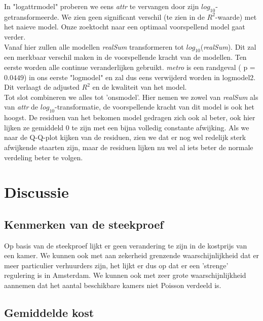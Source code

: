 \documentclass[a4paper]{kulakarticle}
\begin{document}
	In "logattrmodel" proberen we eens \textit{attr} te vervangen door zijn $log_{10}$-getransformeerde. We zien geen significant verschil (te zien in de $R^2$-waarde) met het naieve model. Onze zoektocht naar een optimaal voorspellend model gaat verder. \\
	Vanaf hier zullen alle modellen \textit{realSum} transformeren tot $log_{10}$(\textit{realSum}). Dit zal een merkbaar verschil maken in de voorspellende kracht van de modellen. Ten eerste worden alle continue veranderlijken gebruikt. \textit{metro} is een randgeval ( p = $0.0449$) in ons eerste "logmodel" en zal dus eens verwijderd worden in logmodel2. Dit verlaagt de adjusted $R^2$ en de kwaliteit van het model. \\
	
	Tot slot combineren we alles tot 'onsmodel'. Hier nemen we zowel van \textit{realSum} als van \textit{attr} de $log_{10}$-transformatie, de voorspellende kracht van dit model is ook het hoogst. De residuen van het bekomen model gedragen zich ook al beter, ook hier lijken ze gemiddeld 0 te zijn met een bijna volledig constante afwijking. Als we naar de Q-Q-plot kijken van de residuen, zien we dat er nog wel redelijk sterk afwijkende staarten zijn, maar de residuen lijken nu wel al iets beter de normale verdeling beter te volgen.  
	
	\section{Discussie}
	
	\subsection{Kenmerken van de steekproef}
	Op basis van de steekproef lijkt er geen verandering te zijn in de kostprijs van een kamer. We kunnen ook met aan zekerheid grenzende waarschijnlijkheid dat er meer particulier verhuurders zijn, het lijkt er dus op dat er een 'strenge' regulering is in Amsterdam. We kunnen ook met zeer grote waarschijnlijkheid aannemen dat het aantal beschikbare kamers niet Poisson verdeeld is.
	
	\subsection{Gemiddelde kost}
	
\end{document}
